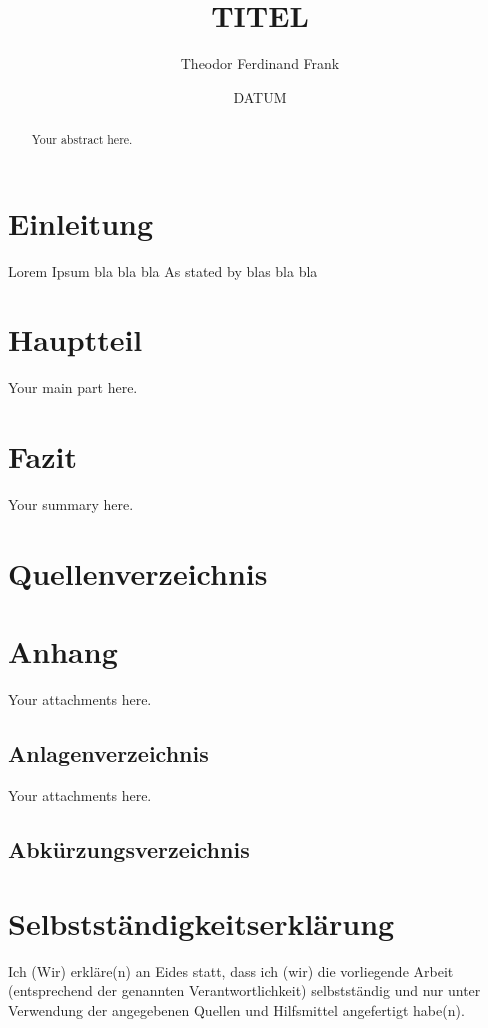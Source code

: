 \documentclass[12pt,a4paper]{article}
\title{TITEL} %
\author{Theodor Ferdinand Frank}
\date{DATUM} %
\begin{document}
%

\begin{abstract}
Your abstract here.
\thispagestyle{empty}
\end{abstract}

\newpage


\tableofcontents
\thispagestyle{empty}


\newpage



\section{Einleitung}
Lorem Ipsum bla\autocite{moews_kosten-_2002} bla bla As stated by 
blas bla bla

\section{Hauptteil}
Your main part here.

\section{Fazit}
Your summary here.


\newpage
\section{Quellenverzeichnis}


\printbibliography
\newpage

\section{Anhang}
Your attachments here.

\subsection{Anlagenverzeichnis}
Your attachments here.

\subsection{Abkürzungsverzeichnis}


\newpage
\section{Selbstständigkeitserklärung}

Ich (Wir) erkläre(n) an Eides statt, dass ich (wir) die vorliegende Arbeit (entsprechend der genannten Verantwortlichkeit) selbstständig und nur unter Verwendung der angegebenen Quellen und Hilfsmittel angefertigt habe(n). 
\medskip
\end{document}

